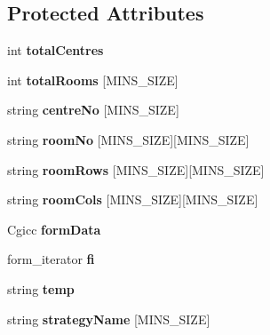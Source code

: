 \subsection*{Protected Attributes}
\begin{DoxyCompactItemize}
\item 
\hypertarget{classReadRoomDetails_aa129e39384751672b59549d8157208a3}{int {\bfseries total\-Centres}}\label{classReadRoomDetails_aa129e39384751672b59549d8157208a3}

\item 
\hypertarget{classReadRoomDetails_ace321366b4a5a91343476cf2c3918eda}{int {\bfseries total\-Rooms} \mbox{[}M\-I\-N\-S\-\_\-\-S\-I\-Z\-E\mbox{]}}\label{classReadRoomDetails_ace321366b4a5a91343476cf2c3918eda}

\item 
\hypertarget{classReadRoomDetails_a7d3fe4925d9d1d61cd1203252fa9520a}{string {\bfseries centre\-No} \mbox{[}M\-I\-N\-S\-\_\-\-S\-I\-Z\-E\mbox{]}}\label{classReadRoomDetails_a7d3fe4925d9d1d61cd1203252fa9520a}

\item 
\hypertarget{classReadRoomDetails_a6b961c05b5c5980de07caec15b25f586}{string {\bfseries room\-No} \mbox{[}M\-I\-N\-S\-\_\-\-S\-I\-Z\-E\mbox{]}\mbox{[}M\-I\-N\-S\-\_\-\-S\-I\-Z\-E\mbox{]}}\label{classReadRoomDetails_a6b961c05b5c5980de07caec15b25f586}

\item 
\hypertarget{classReadRoomDetails_a751d5a539f14f7b1541f24add1a14a8d}{string {\bfseries room\-Rows} \mbox{[}M\-I\-N\-S\-\_\-\-S\-I\-Z\-E\mbox{]}\mbox{[}M\-I\-N\-S\-\_\-\-S\-I\-Z\-E\mbox{]}}\label{classReadRoomDetails_a751d5a539f14f7b1541f24add1a14a8d}

\item 
\hypertarget{classReadRoomDetails_ac9515b760d3bab39cac3673cd276042b}{string {\bfseries room\-Cols} \mbox{[}M\-I\-N\-S\-\_\-\-S\-I\-Z\-E\mbox{]}\mbox{[}M\-I\-N\-S\-\_\-\-S\-I\-Z\-E\mbox{]}}\label{classReadRoomDetails_ac9515b760d3bab39cac3673cd276042b}

\item 
\hypertarget{classReadRoomDetails_a38c9a8165ce1c8078e7843d44a1ba579}{Cgicc {\bfseries form\-Data}}\label{classReadRoomDetails_a38c9a8165ce1c8078e7843d44a1ba579}

\item 
\hypertarget{classReadRoomDetails_a692d9310d1600a6e3bd6cb13247f5ce9}{form\-\_\-iterator {\bfseries fi}}\label{classReadRoomDetails_a692d9310d1600a6e3bd6cb13247f5ce9}

\item 
\hypertarget{classReadRoomDetails_a9d88537ba17a59fb1b1fd54730867969}{string {\bfseries temp}}\label{classReadRoomDetails_a9d88537ba17a59fb1b1fd54730867969}

\item 
\hypertarget{classReadRoomDetails_af3be33bcb331aeca2637e920eced2732}{string {\bfseries strategy\-Name} \mbox{[}M\-I\-N\-S\-\_\-\-S\-I\-Z\-E\mbox{]}}\label{classReadRoomDetails_af3be33bcb331aeca2637e920eced2732}

\end{DoxyCompactItemize}



